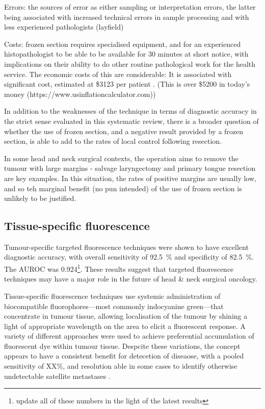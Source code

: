 Errors: the sources of error as either sampling or interpretation errors, the latter being associated with increased technical errors in sample processing and with less experienced pathologists (layfield)

Costs: frozen section requires specialised equipment, and for an experienced histopathologist to be able to be available for 30 minutes at short notice, with implications on their ability to do other routine pathological work for the health service. 
The economic costs of this are considerable: 
It is associated with significant cost, estimated at \$3123 per patient \cite{dinardoAccuracyUtilityCost2000}. 
(This is over \$5200 in today's money (https://www.usinflationcalculator.com))

In addition to the weaknesses of the technique in terms of diagnostic accuracy in the strict sense evaluated in this systematic review, there is a broader question of whether the use of frozen section, and a negative result provided by a frozen section, is able to add to the rates of local control following resection.

In some head and neck surgical contexts, the operation aims to remove the tumour with large margins - salvage laryngectomy and primary tongue resection are key examples. 
In this situation, the rates of positive margins are usually low, and so teh marginal benefit (no pun intended) of the use of frozen section is unlikely to be justified.





\subsection{Tissue-specific fluorescence}

Tumour-specific targeted fluorescence techniques were shown to have excellent diagnostic accuracy, with overall sensitivity of \SI{92.5}{\percent} and specificity of \SI{82.5}{\percent}. 
The AUROC was 0.924\footnote{update all of these numbers in the light of the latest results}. 
These results suggest that targeted fluorescence techniques may have a major role in the future of head \& neck surgical oncology.

Tissue-specific fluorescence techniques use systemic administration of biocompatible fluorophores---most commonly indocyanine green---that concentrate in tumour tissue, allowing localisation of the tumour  by shining a light of appropriate wavelength on the area to elicit a fluorescent response.
A variety of different approaches were used to achieve preferential accumulation of fluorescent dye within tumour tissue.
Despcite these variations, the concept appears to have a consistent benefit for detecetion of diseaose, with a pooled sensitivity of XX\%, and resolution able in some cases to identify otherwise undetectable satellite metastases \cite{voskuilf.j.ImageguidedSurgeryTumor2019}.

